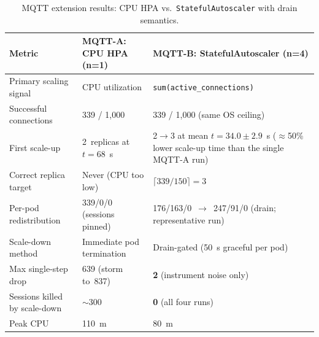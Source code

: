 \documentclass[3p,twocolumn]{elsarticle}
\theoremstyle{plain}%
\theoremstyle{definition}%
\begin{document}
\begin{table}[!tp]
\centering
\caption{MQTT extension results: CPU HPA vs.\ \texttt{StatefulAutoscaler} with drain semantics.}
\label{tab:mqtt_results}
\small
\begin{tabular}{@{}p{4.2cm}p{4.8cm}p{4.8cm}@{}}
\toprule
\rowcolor{gray!12}
\textbf{Metric} & \textbf{MQTT-A: CPU HPA (n=1)} & \textbf{MQTT-B: StatefulAutoscaler (n=4)} \\
\midrule
Primary scaling signal & CPU utilization & \texttt{sum(active\_connections)} \\
Successful connections & 339 / 1{,}000 & 339 / 1{,}000 (same OS ceiling) \\
First scale-up & 2~replicas at $t=68$~s & 2$\rightarrow$3 at mean $t=34.0\pm2.9$~s ($\approx$50\% lower scale-up time than the single MQTT-A run) \\
Correct replica target & Never (CPU too low) & $\lceil 339/150 \rceil = 3$ \\
Per-pod redistribution & 339/0/0 (sessions pinned) & 176/163/0~$\rightarrow$~247/91/0 (drain; representative run) \\
Scale-down method & Immediate pod termination & Drain-gated (50~s graceful per pod) \\
Max single-step drop & 639 (storm to~837) & \textbf{2} (instrument noise only) \\
Sessions killed by scale-down & $\sim$300 & \textbf{0} (all four runs) \\
Peak CPU & 110~m & 80~m \\
\bottomrule
\end{tabular}
\end{table}

\medskip\noindent{}\medskip
\end{document}
